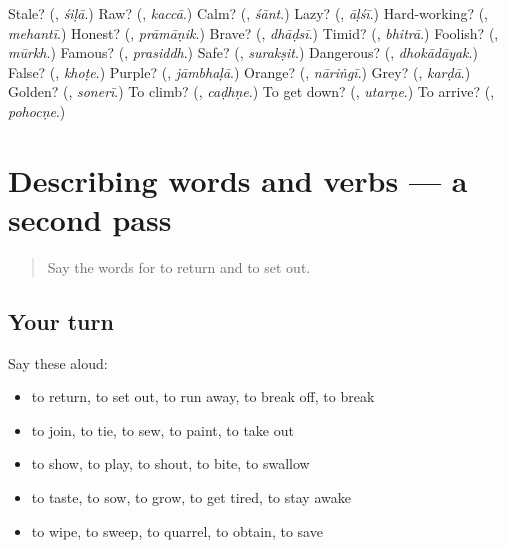 \begin{tcolorbox}[breakable,colback=teal!4,colframe=teal!35!black,title={Before you move on}]
Stale? (\textbf{}, \emph{śiḷā}.) Raw? (\textbf{}, \emph{kaccā}.) Calm? (\textbf{}, \emph{śānt}.) Lazy? (\textbf{}, \emph{āḷśī}.) Hard-working? (\textbf{}, \emph{mehantī}.) Honest? (\textbf{}, \emph{prāmāṇik}.) Brave? (\textbf{}, \emph{dhāḍsī}.) Timid? (\textbf{}, \emph{bhitrā}.) Foolish? (\textbf{}, \emph{mūrkh}.) Famous? (\textbf{}, \emph{prasiddh}.) Safe? (\textbf{}, \emph{surakṣit}.) Dangerous? (\textbf{}, \emph{dhokādāyak}.) False? (\textbf{}, \emph{khoṭe}.) Purple? (\textbf{}, \emph{jāmbhaḷā}.) Orange? (\textbf{}, \emph{nāriṅgī}.) Grey? (\textbf{}, \emph{karḍā}.) Golden? (\textbf{}, \emph{sonerī}.) To climb? (\textbf{}, \emph{caḍhṇe}.) To get down? (\textbf{}, \emph{utarṇe}.) To arrive? (\textbf{}, \emph{pohocṇe}.)
\end{tcolorbox}
\section[(dialogue)]{Describing words and verbs — a second pass}

\label{lesson:MR-R158-second-pass-describing-words-and-verbs}



\begin{quote}
Say the words for to return and to set out.
\end{quote}

\subsection*{Your turn}
Say these aloud:

\begin{itemize}
\raggedright
  \item to return, to set out, to run away, to break off, to break
  \item to join, to tie, to sew, to paint, to take out
  \item to show, to play, to shout, to bite, to swallow
  \item to taste, to sow, to grow, to get tired, to stay awake
  \item to wipe, to sweep, to quarrel, to obtain, to save
\end{itemize}

